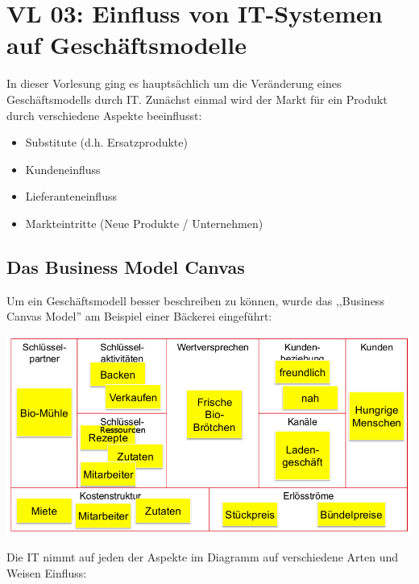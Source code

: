 \newpage
\section{VL 03: Einfluss von IT-Systemen auf Geschäftsmodelle}

In dieser Vorlesung ging es hauptsächlich um die Veränderung eines Geschäftsmodells durch IT. Zunächst einmal wird der Markt für ein Produkt durch verschiedene Aspekte beeinflusst:

\begin{itemize}

    \item Substitute (d.h. Ersatzprodukte)

    \item Kundeneinfluss

    \item Lieferanteneinfluss

    \item Markteintritte (Neue Produkte / Unternehmen)

\end{itemize}

\subsection{Das Business Model Canvas}
    Um ein Geschäftsmodell besser beschreiben zu können, wurde das ,,Business Canvas Model'' am Beispiel einer Bäckerei eingeführt:

    \begin{center}\includegraphics[width=1\textwidth]{BCM.png}\end{center}

    Die IT nimmt auf jeden der Aspekte im Diagramm auf verschiedene Arten und Weisen Einfluss:

